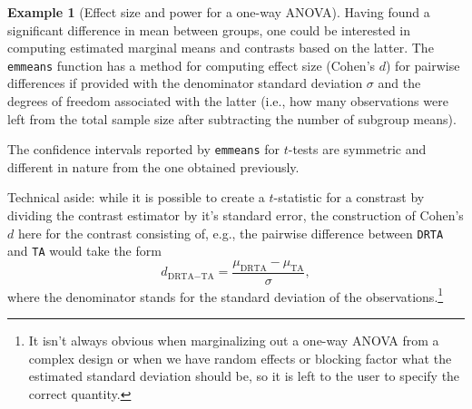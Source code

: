 \documentclass[
  11pt,
  letterpaper,
]{scrbook}
\theoremstyle{definition}
\theoremstyle{definition}
\newtheorem{example}{Example}[chapter]
\theoremstyle{remark}
\begin{document}
\begin{example}[Effect size and power for a one-way
ANOVA]
Having found a significant difference in mean between groups, one could
be interested in computing estimated marginal means and contrasts based
on the latter. The \texttt{emmeans} function has a method for computing
effect size (Cohen's \(d\)) for pairwise differences if provided with
the denominator standard deviation \(\sigma\) and the degrees of freedom
associated with the latter (i.e., how many observations were left from
the total sample size after subtracting the number of subgroup means).

The confidence intervals reported by \texttt{emmeans} for \(t\)-tests
are symmetric and different in nature from the one obtained previously.

Technical aside: while it is possible to create a \(t\)-statistic for a
constrast by dividing the contrast estimator by it's standard error, the
construction of Cohen's \(d\) here for the contrast consisting of, e.g.,
the pairwise difference between \texttt{DRTA} and \texttt{TA} would take
the form \[
d_{\text{DRTA}- \text{TA}} = \frac{\mu_{\text{DRTA}}- \mu_{\text{TA}}}{\sigma},
\] where the denominator stands for the standard deviation of the
observations.\footnote{It isn't always obvious when marginalizing out a
  one-way ANOVA from a complex design or when we have random effects or
  blocking factor what the estimated standard deviation should be, so it
  is left to the user to specify the correct quantity.}

\end{example}
\end{document}
